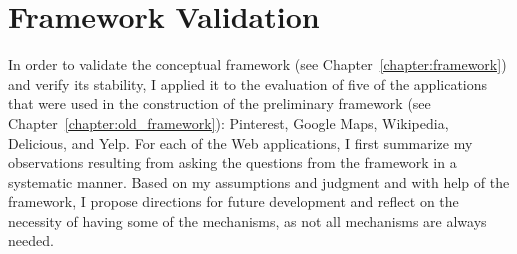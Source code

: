 \chapter{Framework Validation}
\label{chapter:evaluation}

In order to validate the conceptual framework (see Chapter~\ref{chapter:framework}) and verify its stability, I applied it to the evaluation of five of the applications that were used in the construction of the preliminary framework (see Chapter~\ref{chapter:old_framework}): Pinterest, Google Maps, Wikipedia, Delicious, and Yelp. For each of the Web applications, I first summarize my observations resulting from asking the questions from the framework in a systematic manner. Based on my assumptions and judgment and with help of the framework, I propose directions for future development and reflect on the necessity of having some of the mechanisms, as not all mechanisms are always needed.  

